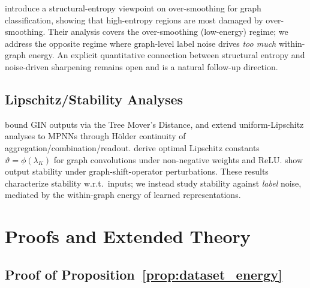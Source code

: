 \citet{exploreOversmoothing} introduce a structural-entropy viewpoint on over-smoothing for graph classification, showing that high-entropy regions are most damaged by over-smoothing. Their analysis covers the over-smoothing (low-energy) regime; we address the opposite regime where graph-level label noise drives \emph{too much} within-graph energy. An explicit quantitative connection between structural entropy and noise-driven sharpening remains open and is a natural follow-up direction.

\subsection{Lipschitz/Stability Analyses}
\citet{chuang2022tree} bound GIN outputs via the Tree Mover's Distance, and \citet{davidson2024h} extend uniform-Lipschitz analyses to MPNNs through Hölder continuity of aggregation/combination/readout. \citet{juvina2024training} derive optimal Lipschitz constants $\vartheta=\phi(\lambda_K)$ for graph convolutions under non-negative weights and ReLU. \citet{gama2020stability} show output stability under graph-shift-operator perturbations. These results characterize stability w.r.t.\ inputs; we instead study stability against \emph{label} noise, mediated by the within-graph energy of learned representations.

\section{Proofs and Extended Theory}
\label{app:proofs}

\subsection{Proof of Proposition~\ref{prop:dataset_energy}}

